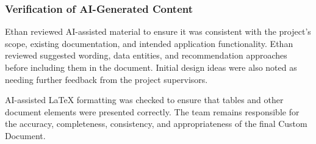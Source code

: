 \documentclass{article}
\begin{document}
\subsubsection{Verification of AI-Generated Content}

Ethan reviewed AI-assisted material to ensure it was
consistent with the project's scope, existing documentation,
and intended application functionality. Ethan reviewed suggested 
wording, data entities, and recommendation approaches before including 
them in the document. Initial design ideas were also noted as needing 
further feedback from the project supervisors.

AI-assisted \LaTeX{} formatting was checked to ensure
that tables and other document elements were presented
correctly. The team remains responsible for the accuracy,
completeness, consistency, and appropriateness of the
final Custom Document.

\newpage




\newpage
\end{document}
